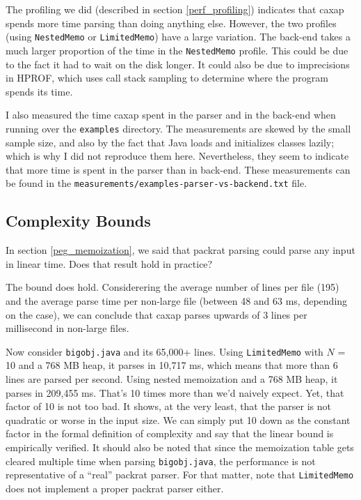 The profiling we did (described in section \ref{perf_profiling}) indicates that
caxap spends more time parsing than doing anything else. However, the two
profiles (using \texttt{NestedMemo} or \texttt{LimitedMemo}) have a large
variation. The back-end takes a much larger proportion of the time in the
\texttt{NestedMemo} profile. This could be due to the fact it had to wait on the
disk longer. It could also be due to imprecisions in HPROF, which uses call
stack sampling to determine where the program spends its time.

I also measured the time caxap spent in the parser and in the back-end when
running over the \texttt{examples} directory. The measurements are skewed by the
small sample size, and also by the fact that Java loads and initializes classes
lazily; which is why I did not reproduce them here. Nevertheless, they seem to
indicate that more time is spent in the parser than in back-end. These
measurements can be found in the
\texttt{measurements/examples-parser-vs-backend.txt} file.

\subsection{Complexity Bounds}

In section \ref{peg_memoization}, we said that packrat parsing could parse any
input in linear time. Does that result hold in practice?

The bound does hold. Considerering the average number of lines per file (195)
and the average parse time per non-large file (between 48 and 63 ms, depending
on the case), we can conclude that caxap parses upwards of 3 lines per
millisecond in non-large files.

Now consider \texttt{bigobj.java} and its 65,000+ lines. Using
\texttt{LimitedMemo} with $N$ = 10 and a 768 MB heap, it parses in 10,717 ms,
which means that more than 6 lines are parsed per second. Using nested
memoization and a 768 MB heap, it parses in 209,455 ms. That's 10 times more
than we'd naively expect. Yet, that factor of 10 is not too bad. It shows, at
the very least, that the parser is not quadratic or worse in the input size. We
can simply put 10 down as the constant factor in the formal definition of
complexity and say that the linear bound is empirically verified. It should also
be noted that since the memoization table gets cleared multiple time when
parsing \texttt{bigobj.java}, the performance is not representative of a
``real'' packrat parser. For that matter, note that \texttt{LimitedMemo} does
not implement a proper packrat parser either.
